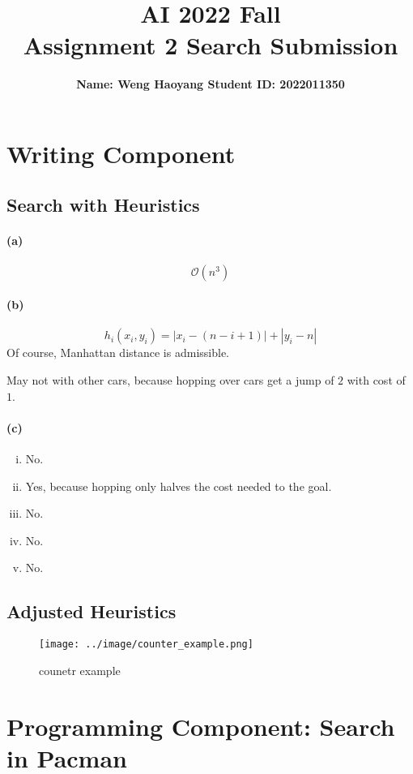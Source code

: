 \documentclass{article}
\title{\bf\Large  AI 2022 Fall\\Assignment 2 Search Submission}
\author{\bf Name: Weng Haoyang \qquad Student ID: 2022011350}
\begin{document}
\maketitle
\section{Writing Component}

\subsection{Search with Heuristics}
\paragraph*{(a)}
\[\mathcal{O} (n^3)\]

\paragraph*{(b)}
\[ h_i(x_i, y_i) = |x_i - (n - i + 1)| + |y_i - n|\]
Of course,  Manhattan distance is admissible.

May not with other cars, because hopping over cars get a jump of \(2\) with cost of \(1\).

\paragraph*{(c)}
\begin{enumerate}[(i)]
    \item No.
    \item Yes, because hopping only halves the cost needed to the goal.
    \item No.
    \item No.
    \item No.
\end{enumerate}

\subsection{Adjusted Heuristics}
\begin{figure}[H]
    \centering
    \texttt{[image: ../image/counter\_example.png]}
    \caption{counetr example}
    \label{fig:counter}
\end{figure}

\section{Programming Component: Search in Pacman}
\setcounter{subsection}{2}
\end{document}
